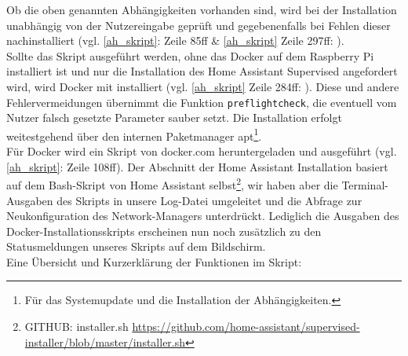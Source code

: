 \noindent Ob die oben genannten Abhängigkeiten vorhanden sind, wird bei der Installation unabhängig von der Nutzereingabe geprüft und gegebenenfalls bei Fehlen dieser nachinstalliert (vgl. \ref{ah_skript}:  Zeile 85ff \& \ref{ah_skript} Zeile 297ff: ).\\
\noindent Sollte das Skript ausgeführt werden, ohne das Docker auf dem Raspberry Pi installiert ist und nur die Installation des Home Assistant Supervised angefordert wird, wird Docker mit installiert (vgl. \ref{ah_skript} Zeile 284ff: ).
Diese und andere Fehlervermeidungen übernimmt die Funktion \texttt{preflightcheck}, die eventuell vom Nutzer falsch gesetzte Parameter sauber setzt.
Die Installation erfolgt weitestgehend über den internen Paketmanager apt\footnote{Für das Systemupdate und die Installation der Abhängigkeiten.}.\\
\noindent Für Docker wird ein Skript von docker.com heruntergeladen und ausgeführt (vgl. \ref{ah_skript}:  Zeile 108ff).
Der Abschnitt der Home Assistant Installation basiert auf dem Bash-Skript von Home Assistant selbst\footnote{GITHUB: installer.sh \url{https://github.com/home-assistant/supervised-installer/blob/master/installer.sh}}, wir haben aber die Terminal-Ausgaben des Skripts in unsere Log-Datei umgeleitet und die Abfrage zur Neukonfiguration des Network-Managers unterdrückt.
Lediglich die Ausgaben des Docker-Installationsskripts erscheinen nun noch zusätzlich zu den Statusmeldungen unseres Skripts auf dem Bildschirm.\\
\newpage
\noindent Eine Übersicht und Kurzerklärung der Funktionen im Skript:
